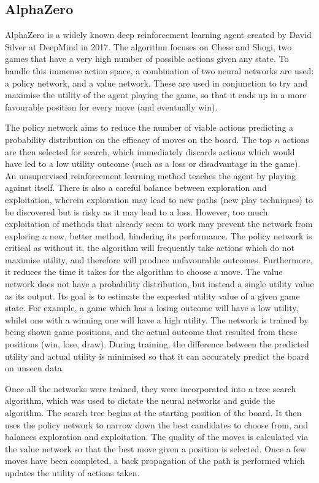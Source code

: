 \documentclass{mpaper}
\begin{document}
\subsection{AlphaZero}

AlphaZero \cite{silver2017mastering} is a widely known deep reinforcement learning agent created by David Silver at DeepMind in 2017. The algorithm focuses on Chess and Shogi, two games that have a very high number of possible actions given any state. To handle this immense action space, a combination of two neural networks are used: a policy network, and a value network. These are used in conjunction to try and maximise the utility of the agent playing the game, so that it ends up in a more favourable position for every move (and eventually win).

The policy network aims to reduce the number of viable actions predicting a probability distribution on the efficacy of moves on the board. The top $n$ actions are then selected for search, which immediately discards actions which would have led to a low utility outcome (such as a loss or disadvantage in the game). An unsupervised reinforcement learning method teaches the agent by playing against itself. There is also a careful balance between exploration and exploitation, wherein exploration may lead to new paths (new play techniques) to be discovered but is risky as it may lead to a loss. However, too much exploitation of methods that already seem to work may prevent the network from exploring a new, better method, hindering its performance. The policy network is critical as without it, the algorithm will frequently take actions which do not maximise utility, and therefore will produce unfavourable outcomes. Furthermore, it reduces the time it takes for the algorithm to choose a move. The value network does not have a probability distribution, but instead a single utility value as its output. Its goal is to estimate the expected utility value of a given game state. For example, a game which has a losing outcome will have a low utility, whilst one with a winning one will have a high utility. The network is trained by being shown game positions, and the actual outcome that resulted from these positions (win, lose, draw). During training, the difference between the predicted utility and actual utility is minimised so that it can accurately predict the board on unseen data.

Once all the networks were trained, they were incorporated into a tree search algorithm, which was used to dictate the neural networks and guide the algorithm. The search tree begins at the starting position of the board. It then uses the policy network to narrow down the best candidates to choose from, and balances exploration and exploitation. The quality of the moves is calculated via the value network so that the best move given a position is selected. Once a few moves have been completed, a back propagation of the path is performed which updates the utility of actions taken.
\end{document}
